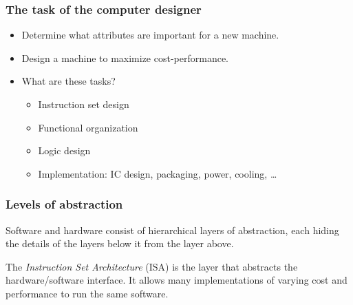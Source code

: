 \subsubsection{The task of the computer designer}
\begin{itemize}
  \item Determine what attributes are important for a new machine.
  \item Design a machine to maximize cost-performance.
  \item What are these tasks?
  \begin{itemize}
    \item Instruction set design
    \item Functional organization
    \item Logic design
    \item Implementation: IC design, packaging, power, cooling, \dots
  \end{itemize}
\end{itemize}

\subsubsection{Levels of abstraction}

Software and hardware consist of hierarchical layers of abstraction, each
hiding the details of the layers below it from the layer above.

\begin{definition}
The \emph{Instruction Set Architecture} (ISA) is the layer that abstracts the
hardware/software interface. It allows many implementations of varying cost
and performance to run the same software.
\end{definition}

